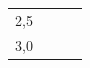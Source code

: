 {\begin{tabular}[t]{|l|l|l|l|}
    
     \tabularnewline\cline{1-1}\cline{2-2}\cline{3-3}\cline{4-4}
    
    
        2,5 &
    
    
         &
    
    
         &
    
    
     \tabularnewline\cline{1-1}\cline{2-2}\cline{3-3}\cline{4-4}
    
    
        3,0 &
    
    
         &
    
    
         &
    
    
     \tabularnewline\cline{1-1}\cline{2-2}\cline{3-3}\cline{4-4}
    \end{tabular}} %
        \addtolength{\mytableboxheight}{\mytableboxdepth}
        \addtocounter{footnote}{-0}
        
